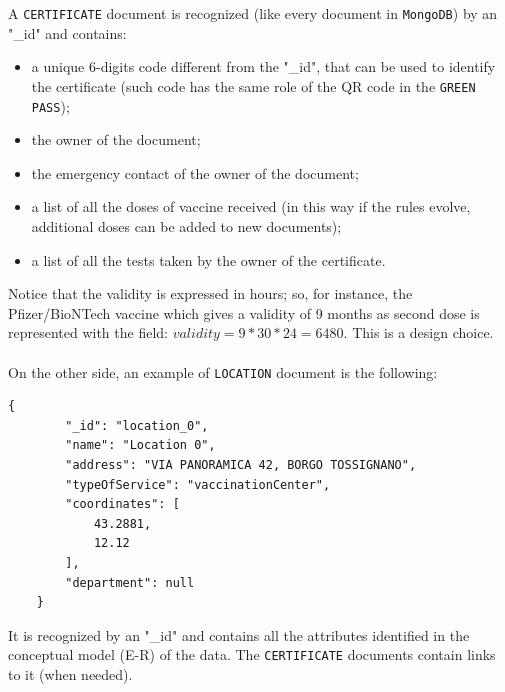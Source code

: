 \documentclass{article}
\begin{document}
A \verb|CERTIFICATE| document is recognized (like every document in \verb|MongoDB|) by an "\_id" and contains:
\begin{itemize}
    \item a unique 6-digits code different from the "\_id", that can be used to identify the certificate (such code has the same role of the QR code in the \verb|GREEN| \verb|PASS|);
    \item the owner of the document;
    \item the emergency contact of the owner of the document;
    \item a list of all the doses of vaccine received (in this way if the rules evolve, additional doses can be added to new documents);
    \item a list of all the tests taken by the owner of the certificate.
\end{itemize}
Notice that the validity is expressed in hours; so, for instance, the Pfizer/BioNTech vaccine which gives a validity of 9 months as second dose is represented with the field: $validity = 9 * 30 * 24 = 6480$.
This is a design choice.\\ \\
\vspace{0.3cm}
On the other side, an example of \verb|LOCATION| document is the following:
\begin{verbatim}
{
        "_id": "location_0",
        "name": "Location 0",
        "address": "VIA PANORAMICA 42, BORGO TOSSIGNANO",
        "typeOfService": "vaccinationCenter",
        "coordinates": [
            43.2881,
            12.12
        ],
        "department": null
    }
\end{verbatim}
It is recognized by an "\_id" and contains all the attributes identified in the conceptual model (E-R) of the data. The \verb|CERTIFICATE| documents contain links to it (when needed).
\end{document}
